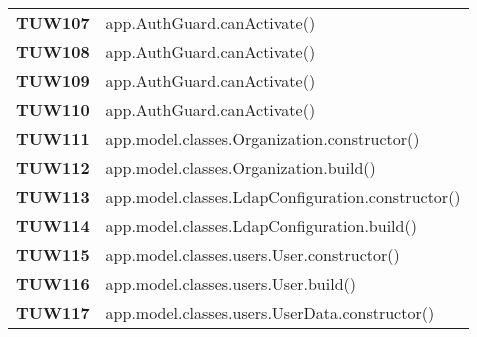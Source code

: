 \documentclass[../../piano-di-qualifica.tex]{subfiles}
\begin{document}
\begin{longtable}[H]{>{\centering\bfseries}m{3cm} >{}m{13cm}}
  TUW107             & app.AuthGuard.canActivate\@()                                                                           \\

  TUW108             & app.AuthGuard.canActivate\@()                                                                           \\

  TUW109             & app.AuthGuard.canActivate\@()                                                                           \\

  TUW110             & app.AuthGuard.canActivate\@()                                                                           \\


  TUW111             & app.model.classes.Organization.constructor\@()                                                          \\

  TUW112             & app.model.classes.Organization.build\@()                                                                \\



  TUW113             & app.model.classes.LdapConfiguration.constructor\@()                                                     \\

  TUW114             & app.model.classes.LdapConfiguration.build\@()                                                           \\


  TUW115             & app.model.classes.users.User.constructor\@()                                                            \\

  TUW116             & app.model.classes.users.User.build\@()                                                                  \\


  TUW117             & app.model.classes.users.UserData.constructor\@()                                                        \\


\end{longtable}
\end{document}
